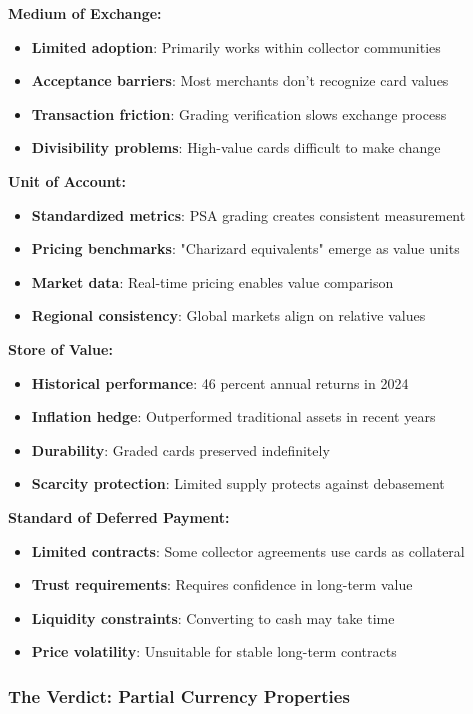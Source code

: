 \documentclass[11pt,oneside]{book}
\begin{document}
\textbf{Medium of Exchange:}
\begin{itemize}
\item \textbf{Limited adoption}: Primarily works within collector communities
\item \textbf{Acceptance barriers}: Most merchants don't recognize card values
\item \textbf{Transaction friction}: Grading verification slows exchange process
\item \textbf{Divisibility problems}: High-value cards difficult to make change
\end{itemize}

\textbf{Unit of Account:}
\begin{itemize}
\item \textbf{Standardized metrics}: PSA grading creates consistent measurement
\item \textbf{Pricing benchmarks}: "Charizard equivalents" emerge as value units
\item \textbf{Market data}: Real-time pricing enables value comparison
\item \textbf{Regional consistency}: Global markets align on relative values
\end{itemize}

\textbf{Store of Value:}
\begin{itemize}
\item \textbf{Historical performance}: 46 percent annual returns in 2024
\item \textbf{Inflation hedge}: Outperformed traditional assets in recent years
\item \textbf{Durability}: Graded cards preserved indefinitely
\item \textbf{Scarcity protection}: Limited supply protects against debasement
\end{itemize}

\textbf{Standard of Deferred Payment:}
\begin{itemize}
\item \textbf{Limited contracts}: Some collector agreements use cards as collateral
\item \textbf{Trust requirements}: Requires confidence in long-term value
\item \textbf{Liquidity constraints}: Converting to cash may take time
\item \textbf{Price volatility}: Unsuitable for stable long-term contracts
\end{itemize}

\subsubsection{The Verdict: Partial Currency Properties}
\end{document}
